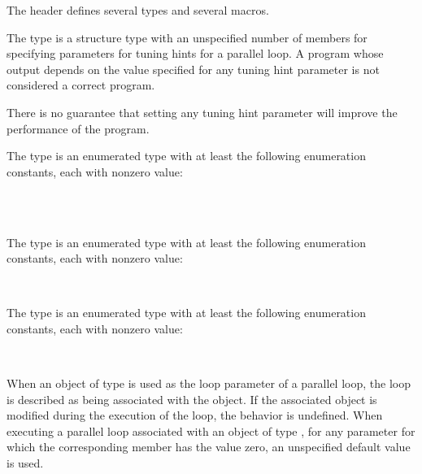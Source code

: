

\pnum
The header
defines several types and several macros.

\pnum
The
type is a structure type
with an unspecified number of members
for specifying parameters for tuning hints for a parallel loop.
A program whose output
depends on the value specified for any tuning hint parameter
is not considered a correct program.

\begin{note}
There is no guarantee that setting any tuning hint parameter
will improve the performance of the program.
\end{note}

\pnum
The
type is an enumerated type
with at least the following enumeration constants,
each with nonzero value:

\begin{ttfamily}
\\
\\
\end{ttfamily}

\pnum
The
type is an enumerated type
with at least the following enumeration constants,
each with nonzero value:

\begin{ttfamily}
\\
\end{ttfamily}

\pnum
The
type is an enumerated type
with at least the following enumeration constants,
each with nonzero value:

\begin{ttfamily}
\\
\end{ttfamily}

\pnum
When an object of type
is used as the loop parameter of a parallel loop,
the loop is described as being associated with the object.
If the associated object is modified during the execution of the loop,
the behavior is undefined.
When executing a parallel loop associated with an object of type
,
for any parameter for which the corresponding member has the value zero,
an unspecified default value is used.

